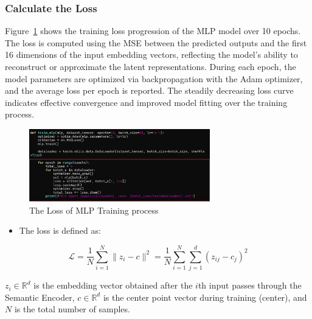 \begin{ZhChapter}
    \subsubsection{Calculate the Loss} %
    Figure~\ref{fig:3132} shows the training loss progression of the MLP model over 10 epochs. The loss is computed using the MSE between the predicted outputs and the first 16 dimensions of the input embedding vectors, reflecting the model's ability to reconstruct or approximate the latent representations. During each epoch, the model parameters are optimized via backpropagation with the Adam optimizer, and the average loss per epoch is reported. The steadily decreasing loss curve indicates effective convergence and improved model fitting over the training process.
    \begin{figure}[htbp]
        \centering
        \includegraphics[width = 0.7\textwidth]{image/Loss.jpg}
        \caption{The Loss of MLP Training process}
        \label{fig:3132}
    \end{figure}


    \begin{itemize}
        \item The loss is defined as:
    \end{itemize}

    \begin{equation}
        \mathcal{L} = \frac{1}{N} \sum_{i=1}^{N} \| z_i - c \|^2
        = \frac{1}{N} \sum_{i=1}^{N} \sum_{j=1}^{d} (z_{ij} - c_j)^2
        \label{eq:centerloss}
    \end{equation}

    $z_i \in \mathbb{R}^d$ is the embedding vector obtained after the $i$th input passes through the Semantic Encoder,
    $c \in \mathbb{R}^d$ is the center point vector during training (center), and $N$ is the total number of samples.


\end{ZhChapter}
